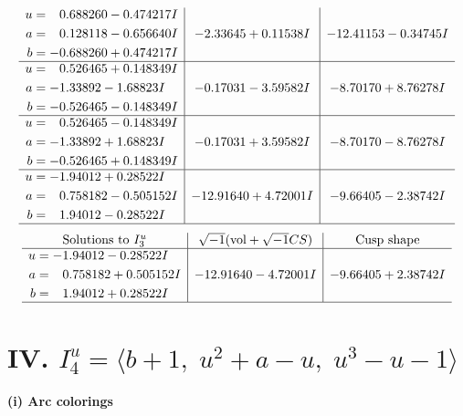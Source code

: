 \documentclass[1p]{elsarticle_modified}
\theoremstyle{definition}
\newcommand{\I}{\sqrt{-1}}
\begin{document}
$$\begin{array}{c|c|c}
\begin{aligned}
u &= \phantom{-}0.688260 - 0.474217 I \\
a &= \phantom{-}0.128118 - 0.656640 I \\
b &= -0.688260 + 0.474217 I\end{aligned}
 & -2.33645 + 0.11538 I & -12.41153 - 0.34745 I \\ \hline\begin{aligned}
u &= \phantom{-}0.526465 + 0.148349 I \\
a &= -1.33892 - 1.68823 I \\
b &= -0.526465 - 0.148349 I\end{aligned}
 & -0.17031 - 3.59582 I & -8.70170 + 8.76278 I \\ \hline\begin{aligned}
u &= \phantom{-}0.526465 - 0.148349 I \\
a &= -1.33892 + 1.68823 I \\
b &= -0.526465 + 0.148349 I\end{aligned}
 & -0.17031 + 3.59582 I & -8.70170 - 8.76278 I \\ \hline\begin{aligned}
u &= -1.94012 + 0.28522 I \\
a &= \phantom{-}0.758182 - 0.505152 I \\
b &= \phantom{-}1.94012 - 0.28522 I\end{aligned}
 & -12.91640 + 4.72001 I & -9.66405 - 2.38742 I\\
 \hline 
 \end{array}$$\newpage$$\begin{array}{c|c|c}  
\text{Solutions to }I^u_{3}& \I (\text{vol} + \sqrt{-1}CS) & \text{Cusp shape}\\
 \hline 
\begin{aligned}
u &= -1.94012 - 0.28522 I \\
a &= \phantom{-}0.758182 + 0.505152 I \\
b &= \phantom{-}1.94012 + 0.28522 I\end{aligned}
 & -12.91640 - 4.72001 I & -9.66405 + 2.38742 I\\
 \hline 
 \end{array}$$\newpage\newpage\renewcommand{\arraystretch}{1}
\centering \section*{IV. $I^u_{4}= \langle b+1,\;u^2+a- u,\;u^3- u-1 \rangle$}
\flushleft \textbf{(i) Arc colorings}\\
\end{document}
